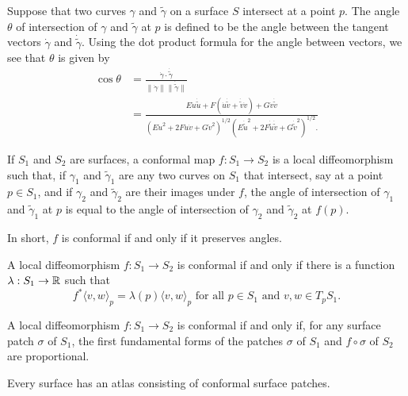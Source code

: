 Suppose that two curves $\gamma$ and $\tilde \gamma$ on a surface $S$
intersect at a point $p$.
The angle $\theta$ of intersection of $\gamma$ and $\tilde \gamma$
at $p$ is defined to be the angle between the tangent vectors
$\dot{\gamma}$ and $\dot{\tilde \gamma}$. Using the dot product
formula for the angle between vectors, we see that $\theta$ is given by
\begin{align*}
  \cos \theta &= \frac{
    \dot{\gamma} \cdot \dot{\tilde \gamma}
  }{
    \|\dot{\gamma}\| \|\dot{\tilde \gamma}\|
  }\\
  &= \frac{
    E \dot{u} \dot{\tilde u} +
    F(\dot{u}\dot{\tilde v} +
    \dot{\tilde v}\dot{v}) + G \dot{v} \dot{\tilde v}
  }{
    (
      E \dot{u}^2 +
      2 F \dot{u}\dot{v} +
      G \dot{v}^2
    )^{1/2}
    (
      E \dot{\tilde u}^2 +
      2 F \dot{\tilde u}\dot{\tilde v} +
      G \dot{\tilde v}^2
    )^{1/2}.
  }
\end{align*}

\begin{defn}
  If $S_1$ and $S_2$ are surfaces, a conformal map $f: S_1 \to S_2$ is a
  local diffeomorphism such that, if $\gamma_1$ and $\tilde \gamma_1$
  are any two curves on $S_1$ that intersect, say at a point $p \in S_1$,
  and if $\gamma_2$ and $\tilde \gamma_2$ are their images under $f$,
  the angle of intersection of $\gamma_1$ and $\tilde \gamma_1$ at $p$
  is equal to the angle of intersection of $\gamma_2$ and $\tilde \gamma_2$
  at $f(p)$.
\end{defn}

In short, $f$ is conformal if and only if it preserves angles.

\begin{theorem}
  A local diffeomorphism $f: S_1 \to S_2$ is conformal if and only if
  there is a function $\lambda: S_1 \to \mathbb{R}$ such that
  \[
    f^*\langle v, w \rangle_p  = \lambda(p) \langle v, w \rangle_p \text{ for all }
    p \in S_1 \text{ and } v, w \in T_p S_1.
  \]
\end{theorem}

\begin{corollary}
  A local diffeomorphism $f: S_1 \to S_2$ is conformal if and only if, for
  any surface patch $\sigma$ of $S_1$, the first fundamental forms of the
  patches $\sigma$ of $S_1$ and $f \circ \sigma$ of $S_2$ are proportional.
\end{corollary}

\begin{theorem}
  Every surface has an atlas consisting of conformal surface patches.
\end{theorem}

